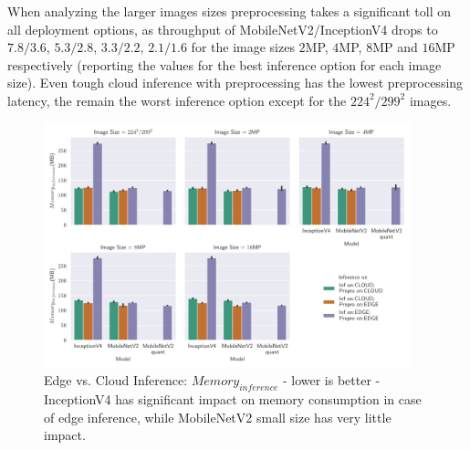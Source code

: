 When analyzing the larger images sizes preprocessing takes a significant toll on all deployment options, as throughput of MobileNetV2/InceptionV4 drops to $7.8/3.6$, $5.3/2.8$, $3.3/2.2$, $2.1/1.6$ for the image sizes $2$MP, $4$MP, $8$MP and $16$MP respectively (reporting the values for the best inference option for each image size).
Even tough cloud inference with preprocessing has the lowest preprocessing latency, the remain the worst inference option except for the $224^2/299^2$ images.

\begin{figure}[!htb]
\centering
\includegraphics[width=0.95\textwidth]{./Bilder/single_plots/edge_vs_cloud_plots/Edge_vs_Cloud_Inference_Inference_Memory.pdf}
\caption[{Edge vs. Cloud Inference:  $Memory_{inference}$ - lower is better}]{Edge vs. Cloud Inference:  $Memory_{inference}$ - lower is better - InceptionV4 has significant impact on memory consumption in case of edge inference, while MobileNetV2 small size has very little impact.}
\label{fig:EdgeVsCloudInferenceMemory}
\end{figure}

